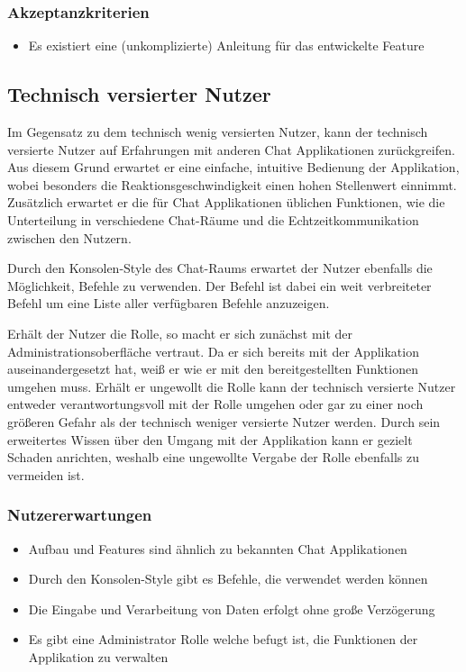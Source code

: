 \subsubsection{Akzeptanzkriterien}
\begin{itemize}
  \item Es existiert eine (unkomplizierte) Anleitung für das entwickelte Feature
\end{itemize}

\subsection{Technisch versierter Nutzer}
Im Gegensatz zu dem technisch wenig versierten Nutzer, kann der technisch versierte Nutzer auf Erfahrungen mit anderen Chat Applikationen zurückgreifen.
Aus diesem Grund erwartet er eine einfache, intuitive Bedienung der Applikation, wobei besonders die Reaktionsgeschwindigkeit einen hohen Stellenwert einnimmt.
Zusätzlich erwartet er die für Chat Applikationen üblichen Funktionen, wie die Unterteilung in verschiedene Chat-Räume und die Echtzeitkommunikation zwischen den Nutzern.

\noindent{}Durch den Konsolen-Style des Chat-Raums erwartet der Nutzer ebenfalls die Möglichkeit, Befehle zu verwenden.
Der Befehl  ist dabei ein weit verbreiteter Befehl um eine Liste aller verfügbaren Befehle anzuzeigen.

\noindent{}Erhält der Nutzer die  Rolle, so macht er sich zunächst mit der Administrationsoberfläche vertraut.
Da er sich bereits mit der Applikation auseinandergesetzt hat, weiß er wie er mit den bereitgestellten Funktionen umgehen muss.
Erhält er ungewollt die Rolle  kann der technisch versierte Nutzer entweder verantwortungsvoll mit der Rolle umgehen oder gar zu einer noch größeren Gefahr als der technisch weniger versierte Nutzer werden.
Durch sein erweitertes Wissen über den Umgang mit der Applikation kann er gezielt Schaden anrichten, weshalb eine ungewollte Vergabe der Rolle ebenfalls zu vermeiden ist.

\subsubsection{Nutzererwartungen}
\begin{itemize}
  \item Aufbau und Features sind ähnlich zu bekannten Chat Applikationen
  \item Durch den Konsolen-Style gibt es Befehle, die verwendet werden können
  \item Die Eingabe und Verarbeitung von Daten erfolgt ohne große Verzögerung
  \item Es gibt eine Administrator Rolle welche befugt ist, die Funktionen der Applikation zu verwalten
\end{itemize}

